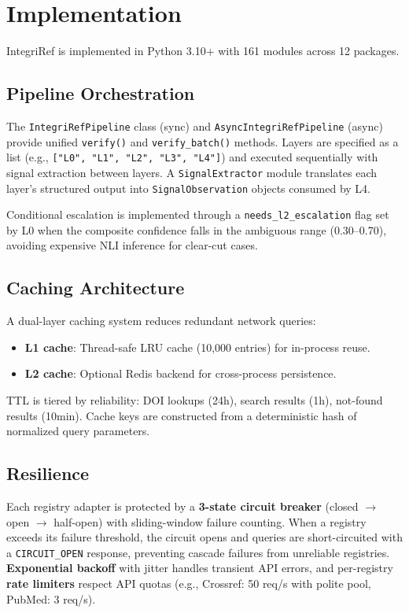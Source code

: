 \documentclass[sigconf,nonacm]{acmart}
\begin{document}
\section{Implementation}
\label{sec:implementation}

IntegriRef is implemented in Python 3.10+ with 161 modules across 12 packages.

\subsection{Pipeline Orchestration}

The \texttt{IntegriRefPipeline} class (sync) and \texttt{AsyncIntegriRefPipeline} (async) provide unified \texttt{verify()} and \texttt{verify\_batch()} methods.
Layers are specified as a list (e.g., \texttt{["L0", "L1", "L2", "L3", "L4"]}) and executed sequentially with signal extraction between layers.
A \texttt{SignalExtractor} module translates each layer's structured output into \texttt{SignalObservation} objects consumed by L4.

Conditional escalation is implemented through a \texttt{needs\_l2\_escalation} flag set by L0 when the composite confidence falls in the ambiguous range (0.30--0.70), avoiding expensive NLI inference for clear-cut cases.

\subsection{Caching Architecture}

A dual-layer caching system reduces redundant network queries:
\begin{itemize}[leftmargin=*]
    \item \textbf{L1 cache}: Thread-safe LRU cache (10,000 entries) for in-process reuse.
    \item \textbf{L2 cache}: Optional Redis backend for cross-process persistence.
\end{itemize}

TTL is tiered by reliability: DOI lookups (24h), search results (1h), not-found results (10min).
Cache keys are constructed from a deterministic hash of normalized query parameters.

\subsection{Resilience}

Each registry adapter is protected by a \textbf{3-state circuit breaker} (closed $\rightarrow$ open $\rightarrow$ half-open) with sliding-window failure counting.
When a registry exceeds its failure threshold, the circuit opens and queries are short-circuited with a \texttt{CIRCUIT\_OPEN} response, preventing cascade failures from unreliable registries.
\textbf{Exponential backoff} with jitter handles transient API errors, and per-registry \textbf{rate limiters} respect API quotas (e.g., Crossref: 50 req/s with polite pool, PubMed: 3 req/s).
\end{document}
